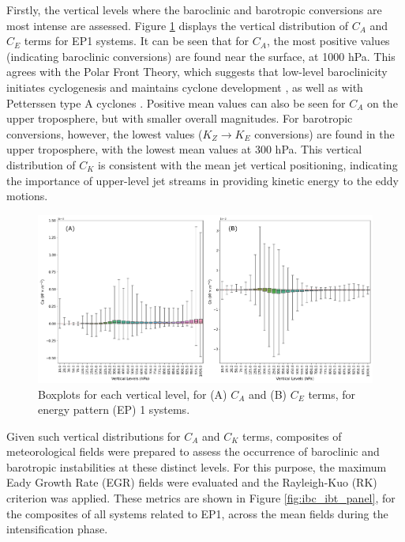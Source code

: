 Firstly, the vertical levels where the baroclinic and barotropic conversions are most intense are assessed. Figure \ref{fig:levels_ibc_ibt} displays the vertical distribution of $C_A$ and $C_E$ terms for EP1 systems. It can be seen that for $C_A$, the most positive values (indicating baroclinic conversions) are found near the surface, at 1000 hPa. This agrees with the Polar Front Theory, which suggests that low-level baroclinicity initiates cyclogenesis and maintains cyclone development \citep{bjerknes1922life}, as well as with Petterssen type A cyclones \citep{petterssen1971development}. Positive mean values can also be seen for $C_A$ on the upper troposphere, but with smaller overall magnitudes. For barotropic conversions, however, the lowest values ($K_Z \rightarrow K_E$ conversions) are found in the upper troposphere, with the lowest mean values at 300 hPa. This vertical distribution of $C_K$ is consistent with the mean jet vertical positioning, indicating the importance of upper-level jet streams in providing kinetic energy to the eddy motions. 

\begin{figure}[!htbp]
    \centering
    \includegraphics[width=\textwidth]{figs_6/levels_ibc_ibt.pdf}
    \caption[Ca and Ck - Vertical Distribution]{Boxplots for each vertical level, for (A) $C_A$ and (B) $C_E$ terms, for energy pattern (EP) 1 systems.}
    \label{fig:levels_ibc_ibt}
\end{figure}

Given such vertical distributions for $C_A$ and $C_K$ terms, composites of meteorological fields were prepared to assess the occurrence of baroclinic and barotropic instabilities at these distinct levels. For this purpose, the maximum Eady Growth Rate (EGR) fields were evaluated and the Rayleigh-Kuo (RK) criterion was applied. These metrics are shown in Figure \ref{fig:ibc_ibt_panel}, for the composites of all systems related to EP1, across the mean fields during the intensification phase.

